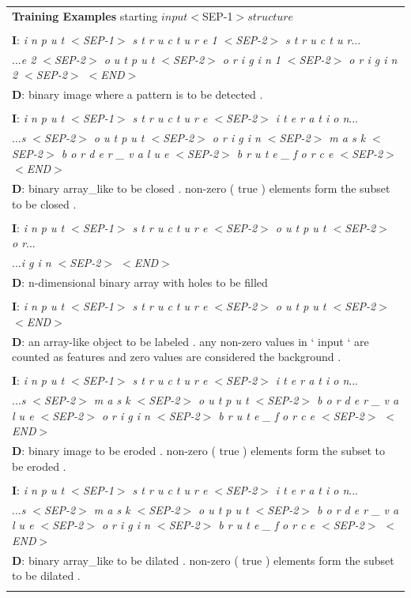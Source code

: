 \begin{table}
\begin{center}
\begin{tabular}{l}
\textbf{Training Examples} starting $input$$<$SEP-1$>$$structure$\\
\\
\textbf{I}: \textit{i n p u t $<$SEP-1$>$ s t r u c t u r e 1 $<$SEP-2$>$ s t r u c t u r}...\\
...\textit{e 2 $<$SEP-2$>$ o u t p u t $<$SEP-2$>$ o r i g i n 1 $<$SEP-2$>$ o r i g i n 2 $<$SEP-2$>$ $<$END$>$}\\
\textbf{D}: binary image where a pattern is to be detected .\\
\\
\textbf{I}: \textit{i n p u t $<$SEP-1$>$ s t r u c t u r e $<$SEP-2$>$ i t e r a t i o n}...\\
...\textit{s $<$SEP-2$>$ o u t p u t $<$SEP-2$>$ o r i g i n $<$SEP-2$>$ m a s k $<$SEP-2$>$ b o r d e r \_ v a l u e $<$SEP-2$>$ b r u t e \_ f o r c e $<$SEP-2$>$ $<$END$>$}\\
\textbf{D}: binary array\_like to be closed . non-zero ( true ) elements form the subset to be closed .\\
\\
\textbf{I}: \textit{i n p u t $<$SEP-1$>$ s t r u c t u r e $<$SEP-2$>$ o u t p u t $<$SEP-2$>$ o r}...\\
...\textit{i g i n $<$SEP-2$>$ $<$END$>$}\\
\textbf{D}: n-dimensional binary array with holes to be filled\\
\\
\textbf{I}: \textit{i n p u t $<$SEP-1$>$ s t r u c t u r e $<$SEP-2$>$ o u t p u t $<$SEP-2$>$ $<$END$>$}\\
\textbf{D}: an array-like object to be labeled . any non-zero values in ` input ` are counted as features and zero values are considered the background .\\
\\
\textbf{I}: \textit{i n p u t $<$SEP-1$>$ s t r u c t u r e $<$SEP-2$>$ i t e r a t i o n}...\\
...\textit{s $<$SEP-2$>$ m a s k $<$SEP-2$>$ o u t p u t $<$SEP-2$>$ b o r d e r \_ v a l u e $<$SEP-2$>$ o r i g i n $<$SEP-2$>$ b r u t e \_ f o r c e $<$SEP-2$>$ $<$END$>$}\\
\textbf{D}: binary image to be eroded . non-zero ( true ) elements form the subset to be eroded .\\
\\
\textbf{I}: \textit{i n p u t $<$SEP-1$>$ s t r u c t u r e $<$SEP-2$>$ i t e r a t i o n}...\\
...\textit{s $<$SEP-2$>$ m a s k $<$SEP-2$>$ o u t p u t $<$SEP-2$>$ b o r d e r \_ v a l u e $<$SEP-2$>$ o r i g i n $<$SEP-2$>$ b r u t e \_ f o r c e $<$SEP-2$>$ $<$END$>$}\\
\textbf{D}: binary array\_like to be dilated . non-zero ( true ) elements form the subset to be dilated .\\
\\




\end{tabular}
\end{center}
\end{table}
